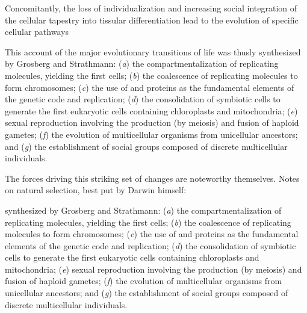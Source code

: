 \documentclass{tufte-book}
\begin{document}
Concomitantly, the loss of individualization and increasing social integration
of the cellular tapestry into tissular differentiation lead to the evolution of
specific cellular pathways

This account of the major evolutionary transitions of life was thusly
synthesized by Grosberg and Strathmann:\cite{grosberg_evolution_2007} (\emph{a})
the compartmentalization of replicating molecules, yielding the first cells;
(\emph{b}) the coalescence of replicating molecules to form chromosomes;
(\emph{c}) the use of  and proteins as the fundamental elements
of the genetic code and replication; (\emph{d}) the consolidation of symbiotic
cells to generate the first eukaryotic cells containing chloroplasts and
mitochondria; (\emph{e}) sexual reproduction involving the production (by
meiosis) and fusion of haploid gametes; (\emph{f}) the evolution of
multicellular organisms from unicellular ancestors; and (\emph{g}) the
establishment of social groups composed of discrete multicellular individuals.

The forces driving this striking set of changes are noteworthy themselves.
Notes on natural selection, best put by Darwin himself:


synthesized by Grosberg and Strathmann:\cite{grosberg_evolution_2007} (\emph{a})
the compartmentalization of replicating molecules, yielding the first cells;
(\emph{b}) the coalescence of replicating molecules to form chromosomes;
(\emph{c}) the use of  and proteins as the fundamental elements
of the genetic code and replication; (\emph{d}) the consolidation of symbiotic
cells to generate the first eukaryotic cells containing chloroplasts and
mitochondria; (\emph{e}) sexual reproduction involving the production (by
meiosis) and fusion of haploid gametes; (\emph{f}) the evolution of
multicellular organisms from unicellular ancestors; and (\emph{g}) the
establishment of social groups composed of discrete multicellular individuals.
\end{document}
